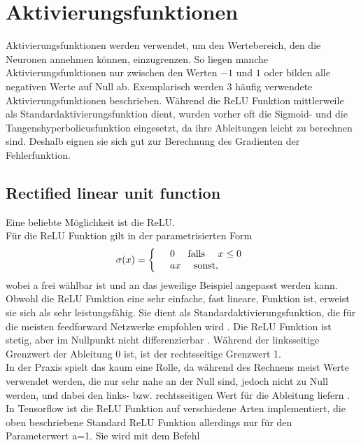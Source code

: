 \newpage
\section{Aktivierungsfunktionen}
Aktivierungsfunktionen werden verwendet, um den Wertebereich, den die Neuronen annehmen k\"onnen, einzugrenzen. So liegen manche Aktivierungsfunktionen nur zwischen den Werten $-1$ und $1$ oder bilden alle negativen Werte auf Null ab. Exemplarisch werden 3 häufig verwendete Aktivierungsfunktionen beschrieben.
Während die \gls{ReLU} Funktion mittlerweile als Standardaktivierungsfunktion dient, wurden vorher oft die Sigmoid- und die Tangenshyperbolicusfunktion eingesetzt, da ihre Ableitungen leicht zu berechnen sind. Deshalb eignen sie sich gut zur Berechnung des Gradienten der Fehlerfunktion.


\subsection{Rectified linear unit function}
Eine beliebte M\"oglichkeit ist die \gls{ReLU}.\\
F\"ur die \gls{ReLU} Funktion gilt in der parametrisierten Form \cite{Goodfellow}
\begin{align*}
\sigma(x)=
\left\{
\begin{array}{l l}
& 0 \quad \text{   falls  } \quad x \leq 0  \\ 
& ax \quad \text{   sonst},
\end{array}
\right.
\end{align*}
wobei a frei w\"ahlbar ist und an das jeweilige Beispiel angepasst werden kann. Obwohl die \gls{ReLU} Funktion eine sehr einfache, fast lineare, Funktion ist, erweist sie sich als sehr leistungsf\"ahig. Sie dient als Standardaktivierungsfunktion, die f\"ur die meisten feedforward Netzwerke empfohlen wird \cite{Goodfellow}. 
Die \gls{ReLU} Funktion ist stetig, aber im Nullpunkt nicht differenzierbar \cite{cookbook}. Während der linksseitige Grenzwert der Ableitung 0 ist, ist der rechtsseitige Grenzwert 1.\\
In der Praxis spielt das kaum eine Rolle, da während des Rechnens meist Werte verwendet werden, die nur sehr nahe an der Null sind, jedoch nicht zu Null werden, und dabei den links- bzw. rechtsseitigen Wert für die Ableitung liefern \cite{Goodfellow}. In Tensorflow ist die \gls{ReLU} Funktion auf verschiedene Arten implementiert, die oben beschriebene Standard \gls{ReLU} Funktion allerdings nur f\"ur den Parameterwert a=1. Sie wird mit dem Befehl \cite{cookbook}

